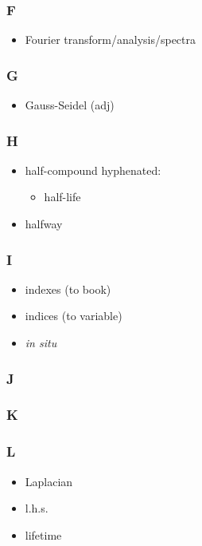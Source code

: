 \documentclass[10pt, letter]{article}
\begin{document}
\begin{multicols}{2}
\subsubsection*{F}
\begin{itemize}
\item Fourier transform/analysis/spectra
\end{itemize}
\subsubsection*{G}
\begin{itemize}
\item Gauss-Seidel (adj)
\end{itemize}
\subsubsection*{H}
\begin{itemize}
\item half-compound hyphenated:
  \begin{itemize}
  \item half-life
  \end{itemize}
\item halfway
\end{itemize}

\subsubsection*{I}
\begin{itemize}
\item indexes (to book)
\item indices (to variable)
\item \textit{in situ}
\end{itemize}

\subsubsection*{J}
\subsubsection*{K}

\subsubsection*{L}
\begin{itemize}
\item Laplacian
\item l.h.s.
\item lifetime
\end{itemize}


\end{multicols}
\end{document}
